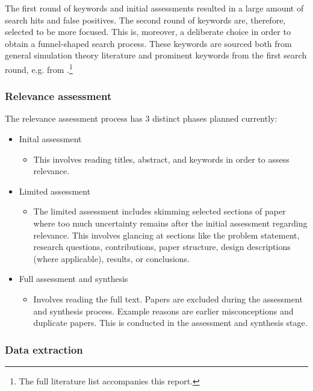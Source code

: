 \documentclass{article}
\begin{document}
\noindent The first round of keywords and initial assessments resulted in a large amount of search hits and false positives. The second round of keywords are, therefore, selected to be more focused. This is, moreover, a deliberate choice in order to obtain a funnel-shaped search process. These keywords are sourced both from general simulation theory literature \cite{law2000, zeigler2000} and prominent keywords from the first search round, e.g. from \cite{bowen2019, alves2018, koutsoukos2017, queiroz2011}.\footnote{The full literature list accompanies this report.}

\subsubsection{Relevance assessment}

The relevance assessment process has 3 distinct phases planned currently:

\begin{itemize}
    \item Inital assessment
        \begin{itemize}
            \item This involves reading titles, abstract, and keywords in order to assess relevance.
        \end{itemize}
    \item Limited assessment
        \begin{itemize}
            \item The limited assessment includes skimming selected sections of paper where too much uncertainty remains after the initial assessment regarding relevance. This involves glancing at sections like the problem statement, research questions, contributions, paper structure, design descriptions (where applicable), results, or conclusions.
        \end{itemize}
    \item Full assessment and synthesis
        \begin{itemize}
            \item Involves reading the full text. Papers are excluded during the assessment and synthesis process. Example reasons are earlier misconceptions and duplicate papers. This is conducted in the assessment and synthesis stage.
        \end{itemize}
\end{itemize}

\subsubsection{Data extraction}
\end{document}
